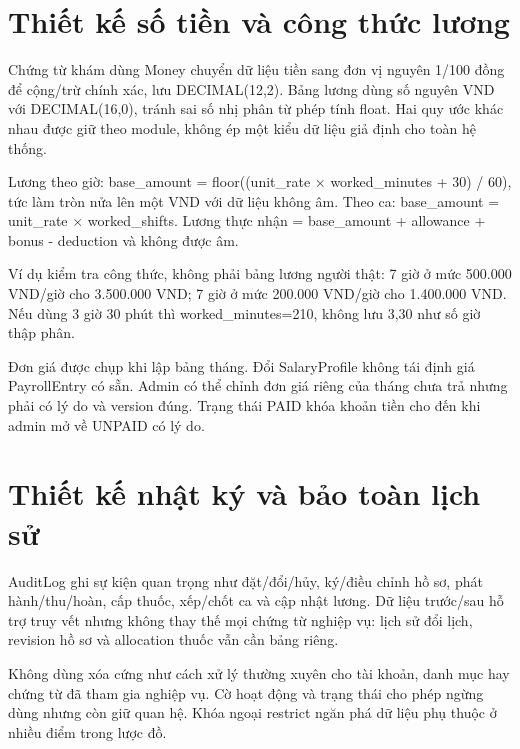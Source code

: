 \section{Thiết kế số tiền và công thức lương}
Chứng từ khám dùng Money chuyển dữ liệu tiền sang đơn vị nguyên 1/\allowbreak{}100 đồng để cộng/\allowbreak{}trừ chính xác, lưu DECIMAL(12,2).\allowbreak{} Bảng lương dùng số nguyên VND với DECIMAL(16,0), tránh sai số nhị phân từ phép tính float.\allowbreak{} Hai quy ước khác nhau được giữ theo module, không ép một kiểu dữ liệu giả định cho toàn hệ thống.\allowbreak{}

Lương theo giờ:\allowbreak{} base\_\allowbreak{}amount = floor((unit\_\allowbreak{}rate × worked\_\allowbreak{}minutes + 30) /\allowbreak{} 60), tức làm tròn nửa lên một VND với dữ liệu không âm.\allowbreak{} Theo ca:\allowbreak{} base\_\allowbreak{}amount = unit\_\allowbreak{}rate × worked\_\allowbreak{}shifts.\allowbreak{} Lương thực nhận = base\_\allowbreak{}amount + allowance + bonus - deduction và không được âm.\allowbreak{}

Ví dụ kiểm tra công thức, không phải bảng lương người thật:\allowbreak{} 7 giờ ở mức 500.\allowbreak{}000 VND/\allowbreak{}giờ cho 3.\allowbreak{}500.\allowbreak{}000 VND; 7 giờ ở mức 200.\allowbreak{}000 VND/\allowbreak{}giờ cho 1.\allowbreak{}400.\allowbreak{}000 VND.\allowbreak{} Nếu dùng 3 giờ 30 phút thì worked\_\allowbreak{}minutes=210, không lưu 3,30 như số giờ thập phân.\allowbreak{}

Đơn giá được chụp khi lập bảng tháng.\allowbreak{} Đổi Salary\allowbreak{}Profile không tái định giá Payroll\allowbreak{}Entry có sẵn.\allowbreak{} Admin có thể chỉnh đơn giá riêng của tháng chưa trả nhưng phải có lý do và version đúng.\allowbreak{} Trạng thái PAID khóa khoản tiền cho đến khi admin mở về UNPAID có lý do.\allowbreak{}


\section{Thiết kế nhật ký và bảo toàn lịch sử}
Audit\allowbreak{}Log ghi sự kiện quan trọng như đặt/\allowbreak{}đổi/\allowbreak{}hủy, ký/\allowbreak{}điều chỉnh hồ sơ, phát hành/\allowbreak{}thu/\allowbreak{}hoàn, cấp thuốc, xếp/\allowbreak{}chốt ca và cập nhật lương.\allowbreak{} Dữ liệu trước/\allowbreak{}sau hỗ trợ truy vết nhưng không thay thế mọi chứng từ nghiệp vụ:\allowbreak{} lịch sử đổi lịch, revision hồ sơ và allocation thuốc vẫn cần bảng riêng.\allowbreak{}

Không dùng xóa cứng như cách xử lý thường xuyên cho tài khoản, danh mục hay chứng từ đã tham gia nghiệp vụ.\allowbreak{} Cờ hoạt động và trạng thái cho phép ngừng dùng nhưng còn giữ quan hệ.\allowbreak{} Khóa ngoại restrict ngăn phá dữ liệu phụ thuộc ở nhiều điểm trong lược đồ.\allowbreak{}

